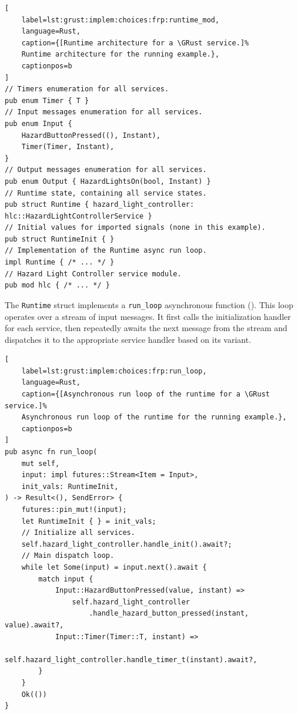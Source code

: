 \begin{lstlisting}[
    label=lst:grust:implem:choices:frp:runtime_mod,
    language=Rust,
    caption={[Runtime architecture for a \GRust service.]%
    Runtime architecture for the running example.},
    captionpos=b
]
// Timers enumeration for all services.
pub enum Timer { T }
// Input messages enumeration for all services.
pub enum Input {
    HazardButtonPressed((), Instant),
    Timer(Timer, Instant),
}
// Output messages enumeration for all services.
pub enum Output { HazardLightsOn(bool, Instant) }
// Runtime state, containing all service states.
pub struct Runtime { hazard_light_controller: hlc::HazardLightControllerService }
// Initial values for imported signals (none in this example).
pub struct RuntimeInit { }
// Implementation of the Runtime async run loop.
impl Runtime { /* ... */ }
// Hazard Light Controller service module.
pub mod hlc { /* ... */ }
\end{lstlisting}

The \texttt{Runtime} struct implements a \texttt{run\_loop} asynchronous function
(). This loop operates over a stream of input
messages. It first calls the initialization handler for each service, then repeatedly
awaits the next message from the stream and dispatches it to the appropriate service
handler based on its variant.

\begin{lstlisting}[
    label=lst:grust:implem:choices:frp:run_loop,
    language=Rust,
    caption={[Asynchronous run loop of the runtime for a \GRust service.]%
    Asynchronous run loop of the runtime for the running example.},
    captionpos=b
]
pub async fn run_loop(
    mut self,
    input: impl futures::Stream<Item = Input>,
    init_vals: RuntimeInit,
) -> Result<(), SendError> {
    futures::pin_mut!(input);
    let RuntimeInit { } = init_vals;
    // Initialize all services.
    self.hazard_light_controller.handle_init().await?;
    // Main dispatch loop.
    while let Some(input) = input.next().await {
        match input {
            Input::HazardButtonPressed(value, instant) =>
                self.hazard_light_controller
                    .handle_hazard_button_pressed(instant, value).await?,
            Input::Timer(Timer::T, instant) =>
                self.hazard_light_controller.handle_timer_t(instant).await?,
        }
    }
    Ok(())
}
\end{lstlisting}

